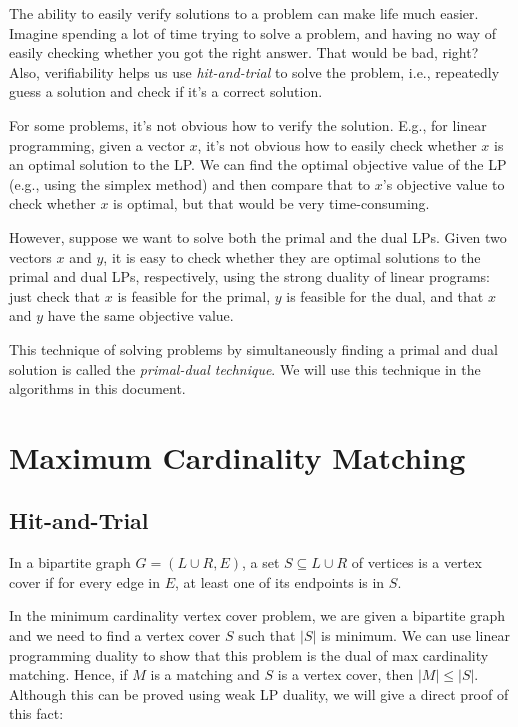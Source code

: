 \documentclass[a4paper,12pt,fleqn]{article}
\begin{document}
The ability to easily verify solutions to a problem can make life much easier.
Imagine spending a lot of time trying to solve a problem,
and having no way of easily checking whether you got the right answer.
That would be bad, right?
Also, verifiability helps us use \emph{hit-and-trial} to solve the problem,
i.e., repeatedly guess a solution and check if it's a correct solution.

For some problems, it's not obvious how to verify the solution.
E.g., for linear programming, given a vector $x$, it's not obvious how to easily check
whether $x$ is an optimal solution to the LP.
We can find the optimal objective value of the LP (e.g., using the simplex method)
and then compare that to $x$'s objective value to check whether $x$ is optimal,
but that would be very time-consuming.

However, suppose we want to solve both the primal and the dual LPs.
Given two vectors $x$ and $y$, it is easy to check whether they are optimal solutions
to the primal and dual LPs, respectively, using the strong duality of linear programs:
just check that $x$ is feasible for the primal, $y$ is feasible for the dual,
and that $x$ and $y$ have the same objective value.

This technique of solving problems by simultaneously finding a primal and dual solution
is called the \emph{primal-dual technique}.
We will use this technique in the algorithms in this document.

\section{Maximum Cardinality Matching}

\subsection{Hit-and-Trial}

\begin{definition}
In a bipartite graph $G = (L \cup R, E)$, a set $S \subseteq L \cup R$ of vertices
is a vertex cover if for every edge in $E$, at least one of its endpoints is in $S$.
\end{definition}

In the minimum cardinality vertex cover problem, we are given a bipartite graph
and we need to find a vertex cover $S$ such that $|S|$ is minimum.
We can use linear programming duality to show that this problem is the dual of max cardinality matching.
Hence, if $M$ is a matching and $S$ is a vertex cover, then $|M| \le |S|$.
Although this can be proved using weak LP duality, we will give a direct proof of this fact:
\end{document}

